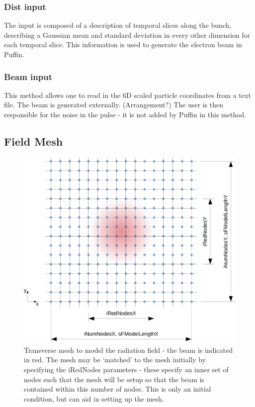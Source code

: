 \documentclass[12pt]{article}%
\begin{document}
\subsubsection{Dist input}

The input is composed of a description of temporal slices along the bunch, describing a Gaussian mean and standard deviation in every other dimension for each temporal slice. This information is used to generate the electron beam in Puffin.

\subsubsection{Beam input}

This method allows one to read in the 6D scaled particle coordinates from a text file. The beam is generated externally. (Arrangement?) The user is then responsible for the noise in the pulse - it is not added by Puffin in this method.


\subsection{Field Mesh}


\begin{figure}
\centering
\includegraphics[width=150mm]{trans_mesh2.png}
\caption{Transverse mesh to model the radiation field - the beam is indicated in red. The mesh may be `matched' to the mesh initially by specifying the iRedNodes parameters - these specify an inner set of nodes such that the mesh will be setup so that the beam is contained within this number of nodes. This is only an initial condition, but can aid in setting up the mesh.}
\label{trmsh}
\end{figure}
\end{document}
